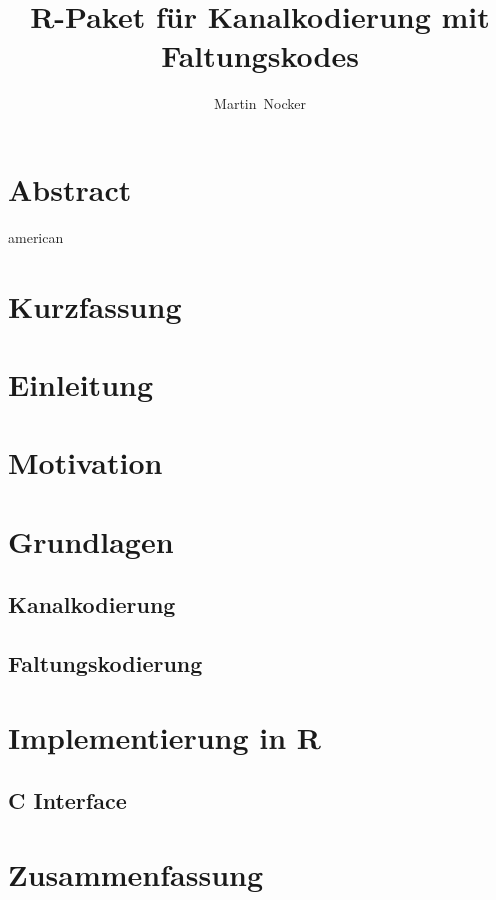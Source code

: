 \documentclass[germanthesis]{thesis-style}
\author{Martin~Nocker}
\title{R-Paket für Kanalkodierung mit Faltungskodes}
\begin{document}
\maketitle
\tableofcontents
{}

\chapter*{Abstract}
\begin{otherlanguage*}{american}
\end{otherlanguage*}

\chapter*{Kurzfassung}
\acresetall%

\chapter{Einleitung}
\chapter{Motivation}
\chapter{Grundlagen}
\section{Kanalkodierung}
\section{Faltungskodierung}
\chapter{Implementierung in R}
\section{C Interface}
\chapter{Zusammenfassung}

\cleardoublepage%

\listofabbreviations
\clearpage

\listoffigures
\clearpage

\listoftables
\clearpage

\lstlistoflistings
\clearpage



\end{document}
